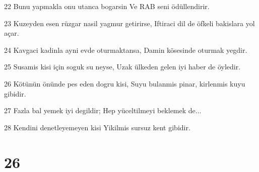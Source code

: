 \par 22 Bunu yapmakla onu utanca bogarsin Ve RAB seni ödüllendirir.
\par 23 Kuzeyden esen rüzgar nasil yagmur getirirse, Iftiraci dil de öfkeli bakislara yol açar.
\par 24 Kavgaci kadinla ayni evde oturmaktansa, Damin kösesinde oturmak yegdir.
\par 25 Susamis kisi için soguk su neyse, Uzak ülkeden gelen iyi haber de öyledir.
\par 26 Kötünün önünde pes eden dogru kisi, Suyu bulanmis pinar, kirlenmis kuyu gibidir.
\par 27 Fazla bal yemek iyi degildir; Hep yüceltilmeyi beklemek de...
\par 28 Kendini denetleyemeyen kisi Yikilmis sursuz kent gibidir.

\chapter{26}

